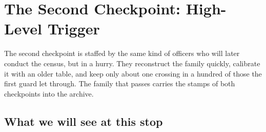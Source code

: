 \providecommand{\placeholderfig}[1]{\fbox{\parbox[c][4cm][c]{0.9\textwidth}{\centering\todo{#1}}}}
\chapter{The Second Checkpoint: High-Level Trigger}
\label{ch:second_checkpoint}

\begin{journeybox}
The second checkpoint is staffed by the same kind of officers who will later
conduct the census, but in a hurry. They reconstruct the family quickly,
calibrate it with an older table, and keep only about one crossing in a
hundred of those the first guard let through. The family that passes
carries the stamps of both checkpoints into the archive. 
\end{journeybox}


\section{What we will see at this stop}
\label{sec:second_checkpoint:what_we_compute}

